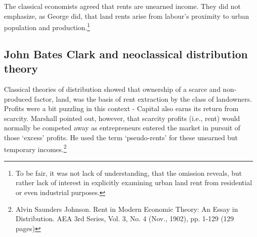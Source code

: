 The classical economists agreed that rents are unearned income. They did not emphasize, as George did, that land rents arise from labour's proximity to urban population and production.\footnote{To be fair, it was not lack of understanding, that the omission reveals, but rather lack of interest in explicitly examining urban land rent from residential or even industrial purposes.}%







  \subsection{John Bates Clark and neoclassical distribution theory}
  Classical theories of distribution showed that ownership of a scarce and non-produced factor, land, was the  basis of rent extraction by the class of landowners. Profits were a bit puzzling in this context - Capital also earns its return from scarcity. Marshall pointed out, however, that scarcity profits (i.e., rent) would normally be competed away  as entrepreneurs entered the market in pursuit of those `excess' profits. He used the term `pseudo-rents' for these unearned but temporary incomes.\footnote{Alvin Saunders Johnson. Rent in Modern Economic Theory: An Essay in Distribution. AEA 3rd Series, Vol. 3, No. 4 (Nov., 1902), pp. 1-129 (129 pages)}

